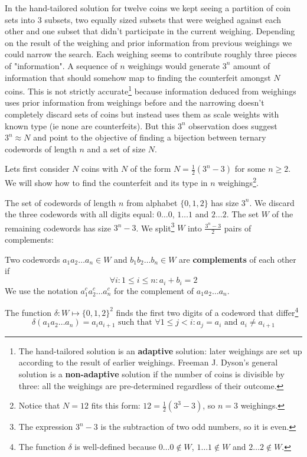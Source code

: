 In the hand-tailored solution for twelve coins we kept seeing a partition of coin sets into 3 subsets, two equally sized subsets that were weighed against each other and one subset that didn't participate in the current weighing. Depending on the result of the weighing and prior information from previous weighings we could narrow the search. Each weighing seems to contribute roughly three pieces of "information". A sequence of $n$ weighings would generate $3^n$ amount of information that should somehow map to finding the counterfeit amongst $N$ coins. This is not strictly accurate\footnote{The hand-tailored solution is an \textbf{adaptive} solution: later weighings are set up according to the result of earlier weighings. Freeman J. Dyson's general solution is a \textbf{non-adaptive} solution if the number of coins is divisible by three: all the weighings are pre-determined regardless of their outcome.} because information deduced from weighings uses prior information from weighings before and the narrowing doesn't completely discard sets of coins but instead uses them as scale weights with known type (ie none are counterfeits). But this $3^n$ observation does suggest $3^n \approx N$ and point to the objective of finding a bijection between ternary codewords of length $n$ and a set of size $N$. 

Lets first consider $N$ coins with $N$ of the form $N = \frac{1}{2} (3^n - 3)$ for some $n \geq 2$. We will show how to find the counterfeit and its type in $n$ weighings\footnote{Notice that $N=12$ fits this form: $12 = \frac{1}{2} (3^3 - 3)$, so $n=3$ weighings.}.

The set of codewords of length $n$ from alphabet $\{0, 1, 2\}$ has size $3^n$. We discard the three codewords with all digits equal: $0\ldots0$, $1\ldots1$ and $2\ldots2$. The set $W$ of the remaining codewords has size $3^n - 3$. We split\footnote{The expression $3^n - 3$ is the subtraction of two odd numbers, so it is even.} $W$ into $\frac{3^n - 3}{2}$ pairs of complements: 

\begin{defn}
Two codewords $a_1 a_2 \ldots a_n \in W$ and $b_1 b_2 \ldots b_n \in W$ are \textbf{complements} of each other if 
$$
\forall i: 1 \leq i \leq n: a_i + b_i = 2
$$
We use the notation $a_1^c a_2^c \ldots a_n^c$ for the complement of $a_1 a_2 \ldots a_n$.
\end{defn}

\begin{defn}
The function $\delta: W \mapsto \{0, 1, 2\}^2$ finds the first two digits of a codeword that differ\footnote{The function $\delta$ is well-defined because $0\ldots0 \notin W$, $1\ldots1 \notin W$ and $2\ldots2 \notin W$.}
$$
\delta (a_1 a_2 \ldots a_n) = a_i a_{i+1} \text{ such that } \forall 1 \leq j < i: a_j = a_i \text{ and } a_i \neq a_{i+1}
$$
\end{defn}

